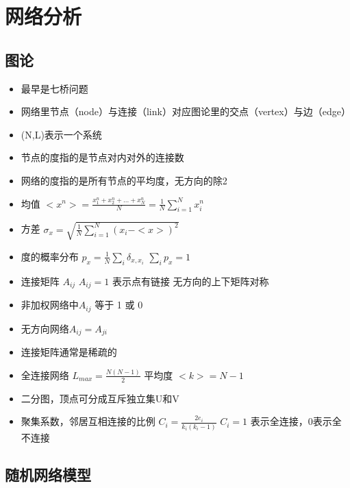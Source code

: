 \documentclass[]{book}
\providecommand{\tightlist}{%
  \setlength{\itemsep}{0pt}\setlength{\parskip}{0pt}}
\begin{document}
\hypertarget{neta}{%
\chapter{网络分析}\label{neta}}

\hypertarget{ux56feux8bba}{%
\section{图论}\label{ux56feux8bba}}

\begin{itemize}
\tightlist
\item
  最早是七桥问题
\item
  网络里节点（node）与连接（link）对应图论里的交点（vertex）与边（edge）
\item
  (N,L)表示一个系统
\item
  节点的度指的是节点对内对外的连接数
\item
  网络的度指的是所有节点的平均度，无方向的除2
\item
  均值 \(<x^n> = \frac{x_1^n+x_2^n+...+x_N^n}{N} = \frac{1}{N}\sum_{i=1}^N x_i^n\)
\item
  方差 \(\sigma_x = \sqrt{\frac{1}{N}\sum_{i=1}^N (x_i-<x>)^2}\)
\item
  度的概率分布 \(p_x = \frac{1}{N}\sum_i \delta_{x,x_i}\) \(\sum_ip_x = 1\)
\item
  连接矩阵 \(A_{ij}\) \(A_{ij} = 1\) 表示点有链接 无方向的上下矩阵对称
\item
  非加权网络中\(A_{ij}\) 等于 1 或 0
\item
  无方向网络\(A_{ij} = A_{ji}\)
\item
  连接矩阵通常是稀疏的
\item
  全连接网络 \(L_{max} = \frac{N(N-1)}{2}\) 平均度 \(<k> = N-1\)
\item
  二分图，顶点可分成互斥独立集U和V
\item
  聚集系数，邻居互相连接的比例 \(C_i = \frac{2e_i}{k_i(k_i-1)}\) \(C_i =1\) 表示全连接，0表示全不连接
\end{itemize}

\hypertarget{ux968fux673aux7f51ux7edcux6a21ux578b}{%
\section{随机网络模型}\label{ux968fux673aux7f51ux7edcux6a21ux578b}}
\end{document}
